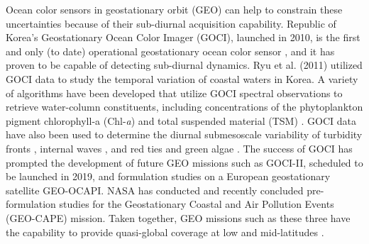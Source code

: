 \documentclass[remotesensing,article,submit,moreauthors,pdftex,10pt,a4paper]{Definitions/mdpi}
\begin{document}




Ocean color sensors in geostationary orbit (GEO) can help to constrain these uncertainties because of their sub-diurnal acquisition capability. Republic of Korea’s Geostationary Ocean Color Imager (GOCI), launched in 2010, is the first and only (to date) operational geostationary ocean color sensor \cite{Ryu2012}, and it has proven to be capable of detecting sub-diurnal dynamics. Ryu et al. (2011) \cite{Ryu2011} utilized GOCI data to study the temporal variation of coastal waters in Korea. A variety of algorithms have been developed that utilize GOCI spectral observations to retrieve water-column constituents, including concentrations of the phytoplankton pigment chlorophyll-a (Chl-{\it a}) and total suspended material (TSM) \cite{kim_2016_TSM,He2013}. GOCI data have also been used to determine the diurnal submesoscale variability of turbidity fronts \cite{Hu2016}, internal waves \cite{kim_2018}, and red ties and green algae \cite{noh_2018,son_2015}. The success of GOCI has prompted the development of future GEO missions such as GOCI-II, scheduled to be launched in 2019, and formulation studies on a European geostationary satellite GEO-OCAPI. NASA has conducted and recently concluded pre-formulation studies for the Geostationary Coastal and Air Pollution Events (GEO-CAPE) mission. Taken together, GEO missions such as these three have the capability to provide quasi-global coverage at low and mid-latitudes \cite{Ruddick2014}. 




\end{document}
